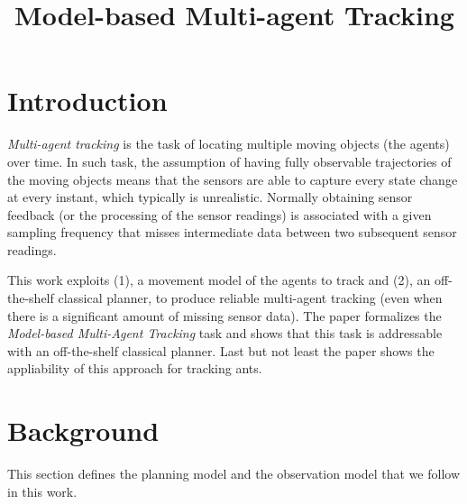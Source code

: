 \documentclass[letterpaper]{article} %
\begin{document}
\title{Model-based Multi-agent Tracking}




\maketitle
\begin{abstract}
\end{abstract}


\section{Introduction}
\label{sec:introduction}

{\em Multi-agent tracking} is the task of locating multiple moving objects (the agents) over time. In such task, the assumption of having fully observable trajectories of the moving objects means that the sensors are able to capture every state change at every instant, which typically is unrealistic. Normally obtaining sensor feedback (or the processing of the sensor readings) is associated with a given sampling frequency that misses intermediate data between two subsequent sensor readings.

This work exploits (1), a movement model of the agents to track and (2), an off-the-shelf classical planner, to produce reliable multi-agent tracking (even when there is a significant amount of missing sensor data). The paper formalizes the {\em Model-based Multi-Agent Tracking} task and shows that this task is addressable with an off-the-shelf classical planner. Last but not least the paper shows the appliability of this approach for tracking ants.


\section{Background}
\label{sec:background}
This section defines the planning model and the observation model that we follow in this work.
\end{document}
